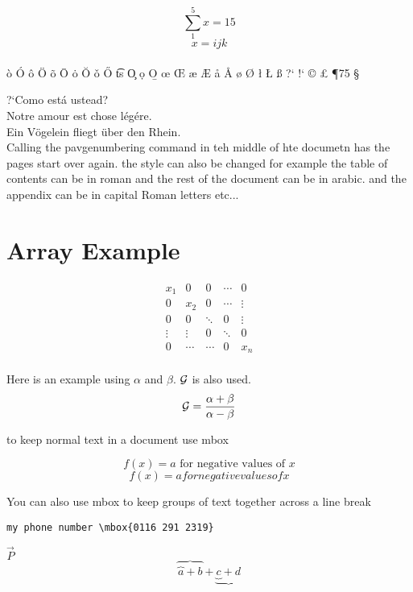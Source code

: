 \documentclass[12pt,twoside,leqno]{article}%
\begin{document}
\[
\textstyle \sum_{1}^ {5} x=15
\]
\begin{equation}
x=i\scriptstyle j \scriptscriptstyle k
\end{equation}
\\
\`{o}
\'{O}
\^{o}
\"{O}
\~{o}
\={O}
\.{o}
\u{O}
\v{o}
\H{O}
\t{ts}
\c{O}
\d{o}
\b{O}
\oe
\OE
\ae
\AE
\aa
\AA
\o
\O
\l
\L
\ss
?`
!`
\copyright
\pounds
\P75
\S
\dag
\ddag

?`Como est\'{a} ustead?\\
Notre amour est chose l\'{e}g\'{e}re.\\
Ein V\"{o}gelein fliegt \"{u}ber den Rhein.\\

Calling the pavgenumbering command in teh middle of hte documetn has the pages start over again. the style can also be changed for example the table of contents can be in roman and the rest of the document can be in arabic. and the appendix can be in capital Roman letters etc...
\section{Array Example}
\[
\begin{array}{ccccc}
x_1 & 0 & 0 &\cdots & 0 \\
0   & x_2 & 0 & \cdots & \vdots \\
0 & 0 & \ddots & 0 & \vdots \\
\vdots & \vdots & 0 & \ddots & 0 \\
0 & \cdots & \cdots & 0 & x_n \\
\end{array}
\]

Here is an example using $\alpha$ and $\beta$. $\cal G$ is also used.
\begin{equation}
{\cal G } = \frac{\alpha +\beta}{\alpha - \beta}
\end{equation}

to keep normal text in a document use mbox

\begin{equation}
f(x)=a \mbox{ for negative values of } x
\end{equation}
\begin{equation}
f(x)=a for negative values of 
x
\end{equation}

You can also use mbox to keep groups of text together across a line break
\begin{verbatim}
my phone number \mbox{0116 291 2319}
\end{verbatim}
$\vec{P}$\\
\[
\overbrace{\overbrace{a} + b} + \underbrace {\underbrace{c} + d}
\]
\end{document}
